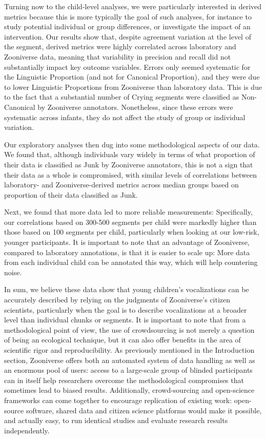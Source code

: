 \documentclass[english,,man]{apa6}
\begin{document}
Turning now to the child-level analyses, we were particularly interested in derived metrics because this is more typically the goal of such analyses, for instance to study potential individual or group differences, or investigate the impact of an intervention. Our results show that, despite agreement variation at the level of the segment, derived metrics were highly correlated across laboratory and Zooniverse data, meaning that variability in precision and recall did not substantially impact key outcome variables. Errors only seemed systematic for the Linguistic Proportion (and not for Canonical Proportion), and they were due to lower Linguistic Proportions from Zooniverse than laboratory data. This is due to the fact that a substantial number of Crying segments were classified as Non-Canonical by Zooniverse annotators. Nonetheless, since these errors were systematic across infants, they do not affect the study of group or individual variation.

Our exploratory analyses then dug into some methodological aspects of our data. We found that, although individuals vary widely in terms of what proportion of their data is classified as Junk by Zooniverse annotators, this is not a sign that their data as a whole is compromised, with similar levels of correlations between laboratory- and Zooniverse-derived metrics across median groups based on proportion of their data classified as Junk.

Next, we found that more data led to more reliable measurements: Specifically, our correlations based on 300-500 segments per child were markedly higher than those based on 100 segments per child, particularly when looking at our low-risk, younger participants. It is important to note that an advantage of Zooniverse, compared to laboratory annotations, is that it is easier to scale up: More data from each individual child can be annotated this way, which will help countering noise.

In sum, we believe these data show that young children's vocalizations can be accurately described by relying on the judgments of Zooniverse's citizen scientists, particularly when the goal is to describe vocalizations at a broader level than individual chunks or segments. It is important to note that from a methodological point of view, the use of crowdsourcing is not merely a question of being an ecological technique, but it can also offer benefits in the area of scientific rigor and reproducibility. As previously mentioned in the Introduction section, Zooniverse offers both an automated system of data handling as well as an enormous pool of users: access to a large-scale group of blinded participants can in itself help researchers overcome the methodological compromises that sometimes lead to biased results. Additionally, crowd-sourcing and open-science frameworks can come together to encourage replication of existing work: open-source software, shared data and citizen science platforms would make it possible, and actually easy, to run identical studies and evaluate research results independently.
\end{document}
